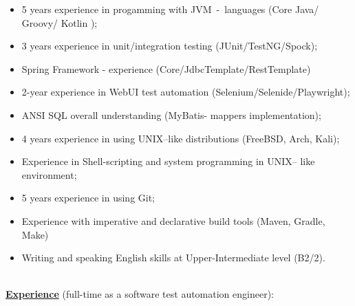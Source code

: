 \documentclass[hidelinks,12pt,a4paper,oneside]{article}
\newcommand*\tqs{\textquotesingle}
\begin{document}
{\normalsize
\begin{itemize}[noitemsep]
	\item 5 years experience in progamming with JVM\ -\ languages (Core \tqs Java\tqs /  \tqs Groovy\tqs / \tqs Kotlin \tqs);
	\item 3 years experience in unit/integration testing (\tqs JUnit\tqs/\tqs TestNG\tqs/\tqs Spock\tqs);
	\item Spring Framework - experience (Core/JdbcTemplate/RestTemplate)
	\item 2-year experience in WebUI test automation (\tqs Selenium\tqs/\tqs Selenide\tqs/\tqs Playwright\tqs);
	\item ANSI SQL overall understanding (\tqs MyBatis\tqs - mappers implementation);
	\item 4 years experience in using \tqs UNIX\tqs --like distributions (\tqs FreeBSD\tqs, \tqs Arch\tqs, \tqs Kali\tqs);
	\item Experience in Shell-scripting and system programming in \tqs UNIX\tqs -- like environment;
	\item 5 years experience in using \tqs Git\tqs;
	\item Experience with imperative and declarative build tools (\tqs Maven\tqs, \tqs Gradle\tqs, \tqs Make\tqs)
	\item Writing and speaking English skills at Upper-Intermediate level (B2/2).
\end{itemize}}
\vspace{-15px}
\ \\
{\Large \underline{\textbf{Experience}}} {\footnotesize (full-time as a software test automation engineer)}:
\end{document}
